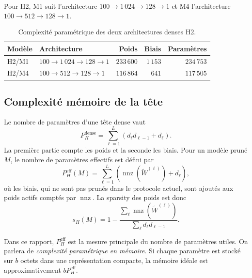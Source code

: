 Pour H2, M1 suit l'architecture
$100\rightarrow1\,024\rightarrow128\rightarrow1$ et M4 l'architecture
$100\rightarrow512\rightarrow128\rightarrow1$.

\begin{table}[!h]
    \centering
    \begin{tabularx}{\textwidth}{|l|X|r|r|r|}
        \hline
        Modèle & Architecture & Poids & Biais & Paramètres \tabularnewline
        \hline
        H2/M1 & $100\rightarrow1\,024\rightarrow128\rightarrow1$
              & $233\,600$ & $1\,153$ & $234\,753$ \tabularnewline
        \hline
        H2/M4 & $100\rightarrow512\rightarrow128\rightarrow1$
              & $116\,864$ & $641$ & $117\,505$ \tabularnewline
        \hline
    \end{tabularx}
    \caption{Complexité paramétrique des deux architectures denses H2.}
    \label{tab:architectures_h2}
\end{table}

\subsection{Complexité mémoire de la tête}
\label{ssec:probleme_memoire}

Le nombre de paramètres d'une tête dense vaut
\begin{equation}
    P_H^{\mathrm{dense}}
    =\sum_{\ell=1}^{L}
      \left(d_{\ell}d_{\ell-1}+d_{\ell}\right).
    \label{eq:parametres_denses}
\end{equation}
La première partie compte les poids et la seconde les biais. Pour un modèle
pruné $M$, le nombre de paramètres effectifs est défini par
\begin{equation}
    P_H^{\mathrm{eff}}(M)
    =\sum_{\ell=1}^{L}
      \left(\operatorname{nnz}\!\left(\widetilde{W}^{(\ell)}\right)
      +d_{\ell}\right),
    \label{eq:parametres_effectifs}
\end{equation}
où les biais, qui ne sont pas prunés dans le protocole actuel, sont ajoutés
aux poids actifs comptés par $\operatorname{nnz}$. La \gls{sparsity} des poids
est donc
\begin{equation}
    s_H(M)=1-
    \frac{\sum_{\ell}\operatorname{nnz}(\widetilde{W}^{(\ell)})}
         {\sum_{\ell}d_{\ell}d_{\ell-1}}.
\end{equation}

Dans ce rapport, $P_H^{\mathrm{eff}}$ est la mesure principale du nombre de
paramètres utiles. On parlera de \emph{complexité paramétrique en mémoire}. Si
chaque paramètre est stocké sur $b$ octets dans une représentation compacte,
la mémoire idéale est approximativement $bP_H^{\mathrm{eff}}$.

